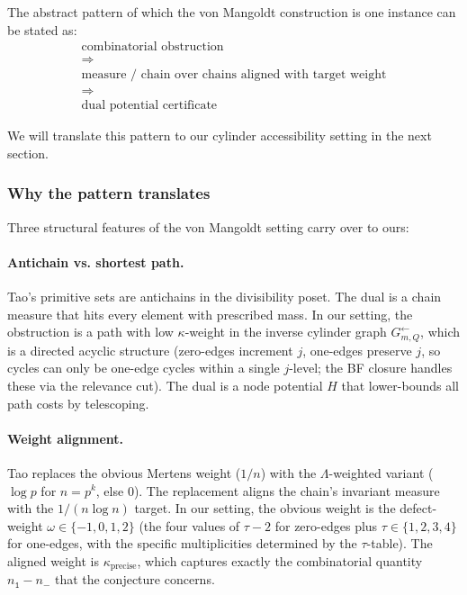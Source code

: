 \documentclass[11pt,a4paper]{article}
\theoremstyle{plain}
\theoremstyle{definition}
\newcommand{\InvG}{G^{\!\leftarrow}}
\newcommand{\numOnes}{n_{\mathtt{1}}}
\newcommand{\numNeg}{n_{\!-}}
\begin{document}
The abstract pattern of which the von Mangoldt construction is one
instance can be stated as:
\[
  \boxed{
    \begin{array}{c}
       \text{combinatorial obstruction} \\
       \Longrightarrow \\
       \text{measure / chain over chains aligned with target weight} \\
       \Longrightarrow \\
       \text{dual potential certificate}
    \end{array}
  }
\]

We will translate this pattern to our cylinder accessibility setting
in the next section.

\subsubsection*{Why the pattern translates}

Three structural features of the von Mangoldt setting carry over
to ours:

\paragraph{Antichain vs. shortest path.}
Tao's primitive sets are antichains in the divisibility poset.
The dual is a chain measure that hits every element with prescribed
mass. In our setting, the obstruction is a path with low
$\kappa$-weight in the inverse cylinder graph $\InvG_{m, Q}$,
which is a directed acyclic structure (zero-edges increment $j$,
one-edges preserve $j$, so cycles can only be one-edge cycles
within a single $j$-level; the BF closure handles these via the
relevance cut). The dual is a node potential $H$ that lower-bounds
all path costs by telescoping.

\paragraph{Weight alignment.}
Tao replaces the obvious Mertens weight ($1/n$) with the
$\Lambda$-weighted variant ($\log p$ for $n = p^k$, else $0$). The
replacement aligns the chain's invariant measure with the
$1/(n \log n)$ target. In our setting, the obvious weight is the
defect-weight $\omega \in \{-1, 0, 1, 2\}$ (the four values of
$\tau - 2$ for zero-edges plus $\tau \in \{1, 2, 3, 4\}$ for
one-edges, with the specific multiplicities determined by the
$\tau$-table). The aligned weight is $\kappa_{\mathrm{precise}}$,
which captures exactly the combinatorial quantity
$\numOnes - \numNeg$ that the conjecture concerns.
\end{document}
